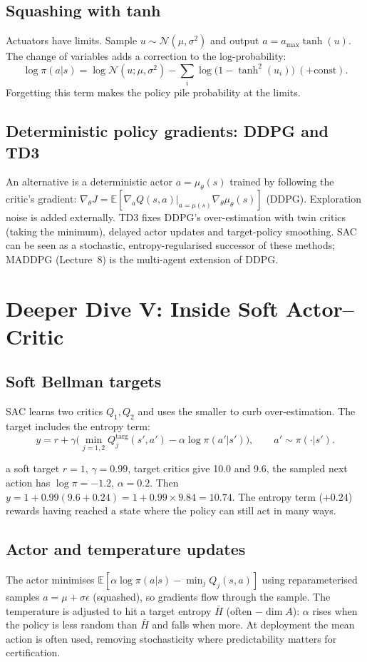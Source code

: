 \documentclass[11pt]{article}
\begin{document}
\subsection{Squashing with tanh}
Actuators have limits. Sample $u\sim\mathcal N(\mu,\sigma^2)$ and output $a=a_{\max}\tanh(u)$. The change of variables adds a correction to the log-probability:
\[\log\pi(a|s)=\log\mathcal N(u;\mu,\sigma^2)-\sum_i\log\big(1-\tanh^2(u_i)\big)\ (+\text{const}).\]
Forgetting this term makes the policy pile probability at the limits.

\subsection{Deterministic policy gradients: DDPG and TD3}
An alternative is a deterministic actor $a=\mu_\theta(s)$ trained by following the critic's gradient: $\nabla_\theta J=\mathbb E[\nabla_aQ(s,a)|_{a=\mu(s)}\nabla_\theta\mu_\theta(s)]$ (DDPG). Exploration noise is added externally. TD3 fixes DDPG's over-estimation with twin critics (taking the minimum), delayed actor updates and target-policy smoothing. SAC can be seen as a stochastic, entropy-regularised successor of these methods; MADDPG (Lecture~8) is the multi-agent extension of DDPG.

\section{Deeper Dive V: Inside Soft Actor--Critic}
\subsection{Soft Bellman targets}
SAC learns two critics $Q_1,Q_2$ and uses the smaller to curb over-estimation. The target includes the entropy term:
\[y=r+\gamma\Big(\min_{j=1,2}Q_j^{\text{targ}}(s',a')-\alpha\log\pi(a'|s')\Big),\qquad a'\sim\pi(\cdot|s').\]
\begin{example}{a soft target}
$r=1$, $\gamma=0.99$, target critics give 10.0 and 9.6, the sampled next action has $\log\pi=-1.2$, $\alpha=0.2$. Then $y=1+0.99(9.6+0.24)=1+0.99\times9.84=10.74$. The entropy term ($+0.24$) rewards having reached a state where the policy can still act in many ways.
\end{example}
\subsection{Actor and temperature updates}
The actor minimises $\mathbb E[\alpha\log\pi(a|s)-\min_jQ_j(s,a)]$ using reparameterised samples $a=\mu+\sigma\epsilon$ (squashed), so gradients flow through the sample. The temperature is adjusted to hit a target entropy $\bar H$ (often $-\dim A$): $\alpha$ rises when the policy is less random than $\bar H$ and falls when more. At deployment the mean action is often used, removing stochasticity where predictability matters for certification.
\end{document}
